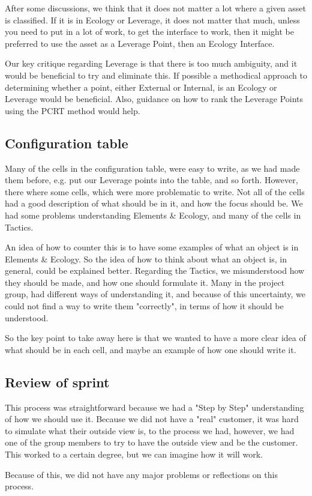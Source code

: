 After some discussions, we think that it does not matter a lot where a given asset is classified.
If it is in Ecology or Leverage, it does not matter that much, unless you need to put in a lot of work, to get the interface to work, then it might be preferred to use the asset as a Leverage Point, then an Ecology Interface.

Our key critique regarding Leverage is that there is too much ambiguity, and it would be beneficial to try and eliminate this. 
If possible a methodical approach to determining whether a point, either External or Internal, is an Ecology or Leverage would be beneficial.
Also, guidance on how to rank the Leverage Points using the PCRT method would help.

\subsection{Configuration table}
Many of the cells in the configuration table, were easy to write, as we had made them before, e.g. put our Leverage points into the table, and so forth.
However, there where some cells, which were more problematic to write.
Not all of the cells had a good description of what should be in it, and how the focus should be.
We had some problems understanding Elements \& Ecology, and many of the cells in Tactics.

An idea of how to counter this is to have some examples of what an object is in Elements \& Ecology.
So the idea of how to think about what an object is, in general, could be explained better. 
Regarding the Tactics, we misunderstood how they should be made, and how one should formulate it.
Many in the project group, had different ways of understanding it, and because of this uncertainty, we could not find a way to write them "correctly", in terms of how it should be understood.

So the key point to take away here is that we wanted to have a more clear idea of what should be in each cell, and maybe an example of how one should write it.

\subsection{Review of sprint}
This process was straightforward because we had a "Step by Step" understanding of how we should use it.
Because we did not have a "real" customer, it was hard to simulate what their outside view is, to the process we had, however, we had one of the group members to try to have the outside view and be the customer.
This worked to a certain degree, but we can imagine how it will work.

Because of this, we did not have any major problems or reflections on this process.
